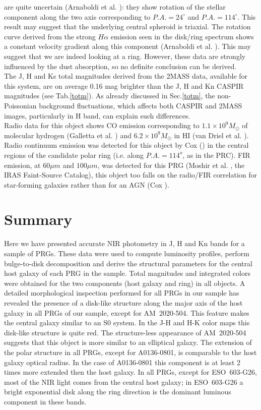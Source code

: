 \documentclass{aa}
\begin{document}
are quite uncertain (Arnaboldi et al. \cite{magda95}):
they show rotation of the stellar component along the two axis 
corresponding to $P.A.=24^\circ$ and $P.A.=114^\circ$. 
This result may suggest that the underlying central spheroid is triaxial. 
The rotation curve derived from the strong $H\alpha$ emission seen in the
disk/ring spectrum shows a constant velocity gradient along this
component (Arnaboldi et al. \cite{magda95}). This may suggest that we are
indeed looking at a ring.
However, these data are strongly influenced by the dust absorption, 
so no definite conclusion can be derived.\\
The J, H and Ks total magnitudes derived from the 2MASS data, available
for this system, are on average 0.16 mag brighter than the J, H and Kn CASPIR 
magnitudes (see Tab.\ref{totm}). As already discussed in Sec.\ref{totm},
the non-Poissonian background fluctuations, which affects both CASPIR
and 2MASS images, particularly in H band, can explain such differences.\\
Radio data for this object shows CO emission corresponding to 
$1.1 \times 10^9 M_{\odot}$ of molecular hydrogen (Galletta et al. 
\cite{galletta97}) and $6.2 \times 10^9 M_{\odot}$ in HI (van Driel et al. 
\cite{vdriel2000}).
Radio continuum emission was detected for this object by Cox
(\cite{Cox96}) in the central regions of the candidate polar ring 
(i.e. along $P.A.=114^o$, as in the 
PRC). FIR emission, at $60\mu m$ and $100\mu m$, was detected for this PRG 
(Moshir et al. \cite{Moshir90}, the IRAS Faint-Source Catalog),  
this object too falls on the radio/FIR correlation 
for star-forming galaxies rather than for an AGN (Cox \cite{Cox96}).


\section{Summary}\label{conclu}
Here we have presented accurate NIR photometry in J, H and Kn bands for a 
sample of PRGs.
These data were used to compute luminosity profiles, perform bulge-to-disk
decomposition and derive the structural parameters for the central host galaxy
of each PRG in the sample.
Total magnitudes and integrated colors were obtained for the two components
(host galaxy and ring) in all objects. 
A detailed morphological inspection performed for all PRGs in our sample
has revealed the presence of a disk-like structure along the major axis of
the host galaxy in all PRGs of our sample, except for AM~2020-504. This
feature makes the central galaxy similar to an S0 system. In the J-H and
H-K color maps this disk-like structure is quite red. 
The structure-less appearance of AM~2020-504 suggests that 
this object is more similar to an elliptical galaxy.
The extension of the polar structure in all PRGs, except for A0136-0801,
is comparable to the host galaxy optical radius. In the case of A0136-0801
this component is at least 2 times more extended then the host galaxy.
In all PRGs, except for ESO~603-G26, most of the NIR light comes from 
the central host galaxy; in ESO~603-G26 a bright exponential disk 
along the ring direction is the dominant luminous component in these bands.
\end{document}
